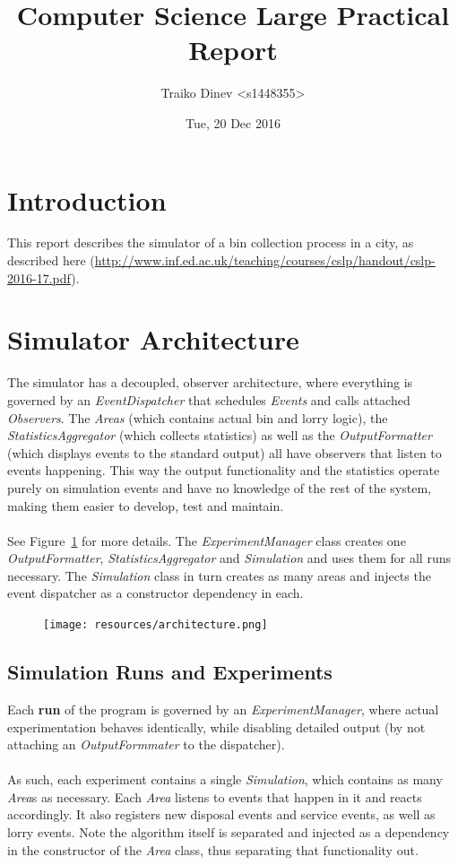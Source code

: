 \documentclass{article}
\title{Computer Science Large Practical Report}
\date{Tue, 20 Dec 2016}
\author{Traiko Dinev \textless s1448355\textgreater}
\begin{document}
	\maketitle

    \section{Introduction}
		This report describes the simulator of a bin collection process in a city, as described here (\url{http://www.inf.ed.ac.uk/teaching/courses/cslp/handout/cslp-2016-17.pdf}).
	
	\section{Simulator Architecture}
		The simulator has a decoupled, observer architecture, where everything is governed by an \textit{EventDispatcher} that schedules
		\textit{Events} and calls attached \textit{Observers}. The \textit{Areas} (which contains actual bin and lorry logic), the \textit{StatisticsAggregator}
		(which collects statistics) as well as the \textit{OutputFormatter} (which displays events to the standard output)
		 all have observers that listen to events happening. This way the output functionality and the statistics
		operate purely on simulation events and have no knowledge of the rest of the system, making them easier to develop, test and maintain.
		\\ \\
		See Figure~\ref{fig:fig1} for more details. The \textit{ExperimentManager} class creates one \textit{OutputFormatter}, \textit{StatisticsAggregator}
		and \textit{Simulation} and uses them for all runs necessary. The \textit{Simulation} class in turn creates as many areas and injects the event
		dispatcher as a constructor dependency in each.

		\begin{figure}[H]
		\centering
			\texttt{[image: resources/architecture.png]}
			\label{fig:fig1} 
		\end{figure}

	\subsection{Simulation Runs and Experiments}
		Each \textbf{run} of the program is governed by an \textit{ExperimentManager}, where actual experimentation behaves identically, while
		disabling detailed output (by not attaching an \textit{OutputFormmater} to the dispatcher).
		\\
		\\
		As such, each experiment contains a single \textit{Simulation}, which contains as many \textit{Area}s as necessary.
		Each \textit{Area} listens to events that happen in it and reacts accordingly. It also registers new disposal events and service events,
		as well as lorry events. Note the algorithm itself is separated and injected as a dependency in the constructor of the \textit{Area} class, thus
		separating that functionality out.
\end{document}
